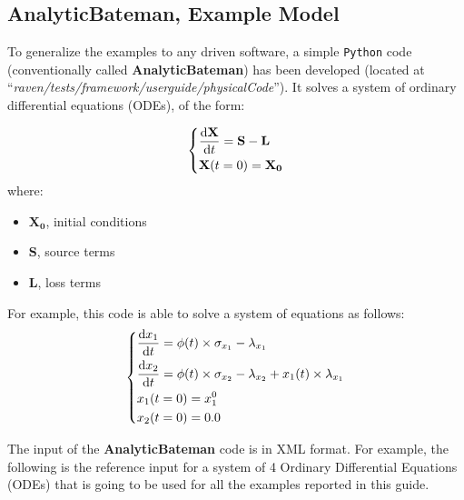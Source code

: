 \subsection{AnalyticBateman, Example Model}\label{sec:analyticalbateman}
To generalize the examples to any driven software, a simple \texttt{Python} code (conventionally called \textbf{AnalyticBateman})
has been developed (located at ``\textit{raven/tests/framework/user\textunderscore guide/physicalCode}''). It solves a
system of ordinary differential equations (ODEs), of the form:

\begin{equation}
\begin{dcases}
\frac{\mathrm{d} \mathbf{X}}{\mathrm{d} t} = \mathbf{S}-\mathbf{L} \\
 \mathbf{X}(t=0)= \mathbf{X_{0}}
\end{dcases}
\end{equation}
   where:
  \begin{itemize}
     \item $\mathbf{X_{0}}$, initial conditions
     \item $\mathbf{S}$, source terms
     \item $\mathbf{L}$, loss terms
   \end{itemize}

For example, this  code is able to solve a system of equations as follows:
\begin{equation}
  \begin{dcases}
   \frac{\mathrm{d} x_{1}}{\mathrm{d} t} = \phi (t)\times \sigma_{x_{1}}-\lambda_{x_{1}} \\
   \frac{\mathrm{d} x_{2}}{\mathrm{d} t} = \phi (t)\times \sigma_{x_{2}}-\lambda_{x_{2}}+x_{1}(t)\times\lambda_{x_{1}} \\
    x_{1}(t=0)= x_{1}^{0} \\
    x_{2}(t=0)= 0.0
  \end{dcases}
\end{equation}

The input of the \textbf{AnalyticBateman} code is in XML format.
For example, the following is the reference input for a system of 4 Ordinary Differential Equations (ODEs)
that is going to be used for all the examples reported in this guide.

